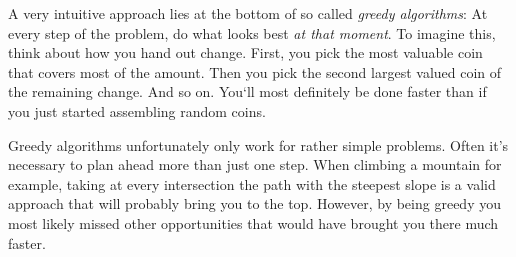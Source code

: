 
A very intuitive approach lies at the bottom of so called \emph{greedy algorithms}: At every step of the problem, do what looks best \emph{at that moment}. To imagine this, think about how you hand out change. First, you pick the most valuable coin that covers most of the amount. Then you pick the second largest valued coin of the remaining change. And so on. You`ll most definitely be done faster than if you just started assembling random coins.

Greedy algorithms unfortunately only work for rather simple problems. Often it's necessary to plan ahead more than just one step. When climbing a mountain for example, taking at every intersection the path with the steepest slope is a valid approach that will probably bring you to the top. However, by being greedy you most likely missed other opportunities that would have brought you there much faster.

